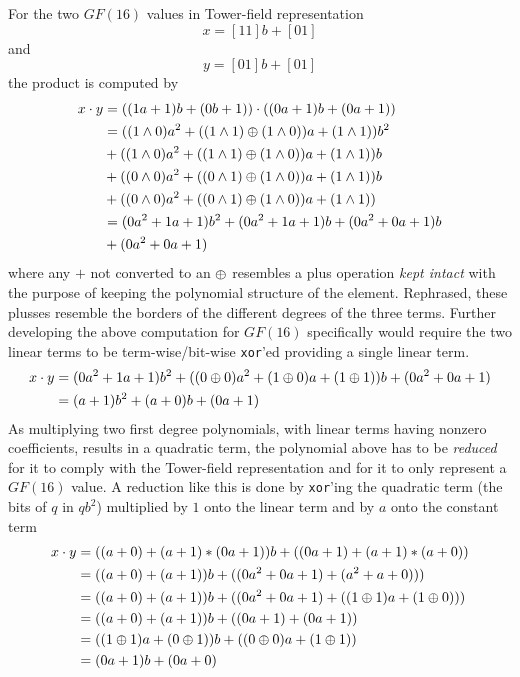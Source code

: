 For the two $GF(16)$ values in Tower-field representation
$$
    x = [11]b + [01]
$$
and
$$
    y = [01]b + [01]
$$
the product is computed by
\begin{equation*}
    \begin{split}
        x \cdot y &= ((1a + 1)b + (0b + 1)) \cdot ((0a + 1)b + (0a + 1))\\
        &= ((1 \wedge 0)a^2 + ((1 \wedge 1) \oplus (1 \wedge 0))a + (1 \wedge 1))b^2\\ 
        &+ ((1 \wedge 0)a^2 + ((1 \wedge 1) \oplus (1 \wedge 0))a + (1 \wedge 1))b\\
        &+ ((0 \wedge 0)a^2 + ((0 \wedge 1) \oplus (1 \wedge 0))a + (1 \wedge 1))b\\
        &+ ((0 \wedge 0)a^2 + ((0 \wedge 1) \oplus (1 \wedge 0))a + (1 \wedge 1))\\
        &= (0a^2 + 1a + 1)b^2 + (0a^2 + 1a + 1)b + (0a^2 + 0a + 1)b\\
        &+ (0a^2 + 0a + 1)\\
    \end{split}
\end{equation*}
where any $+$ not converted to an $\oplus$ resembles a plus operation \emph{kept intact} with the purpose of keeping the polynomial structure of the element. Rephrased, these plusses resemble the borders of the different degrees of the three terms. Further developing the above computation for $GF(16)$ specifically would require the two linear terms to be term-wise/bit-wise \texttt{xor}'ed providing a single linear term.
\begin{equation*}
    \begin{split}
        x\cdot y &= (0a^2 + 1a + 1)b^2 + ((0 \oplus 0)a^2 + (1 \oplus 0)a + (1 \oplus 1))b + (0a^2 + 0a + 1)\\
        &= (a + 1)b^2 + (a + 0)b + (0a + 1)
    \end{split}
\end{equation*}
As multiplying two first degree polynomials, with linear terms having nonzero coefficients, results in a quadratic term, the polynomial above has to be \emph{reduced} for it to comply with the Tower-field representation and for it to only represent a $GF(16)$ value. A reduction like this is done by \texttt{xor}'ing the quadratic term (the bits of $q$ in $qb^2$) multiplied by $1$ onto the linear term and by $a$ onto the constant term
\begin{equation*}
    \begin{split}
        x\cdot y &= ((a + 0) + (a + 1)*(0a + 1))b + ((0a + 1) + (a + 1)*(a + 0))\\
        &= ((a + 0) + (a + 1))b + ((0a^2 + 0a + 1) + (a^2 + a + 0)))\\
        &= ((a + 0) + (a + 1))b + ((0a^2 + 0a + 1) + ((1 \oplus 1)a + (1 \oplus 0)))\\
        &= ((a + 0) + (a + 1))b + ((0a + 1) + (0a + 1))\\
        &= ((1 \oplus 1)a + (0 \oplus 1))b + ((0 \oplus 0)a + (1 \oplus 1))\\
        &= (0a + 1)b + (0a + 0)
    \end{split}
\end{equation*}

